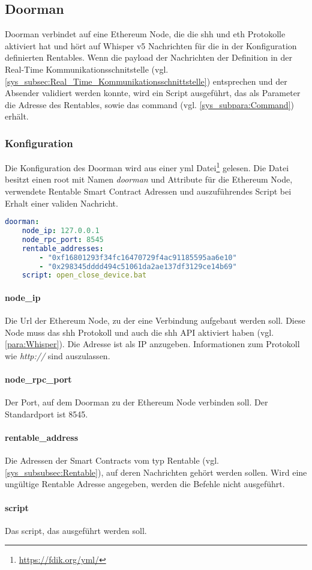 \subsection{Doorman}
\label{sys_subsec:Doorman}
Doorman verbindet auf eine Ethereum Node, die die shh und eth Protokolle aktiviert hat und hört auf Whisper v5 Nachrichten für die in der Konfiguration definierten Rentables. Wenn die payload der Nachrichten der Definition in der Real-Time Kommunikationsschnitstelle (vgl. \ref{sys_subsec:Real_Time_Kommunikationsschnittstelle}) entsprechen und der Absender validiert werden konnte, wird ein Script ausgeführt, das als Parameter die Adresse des Rentables, sowie das command (vgl. \ref{sys_subpara:Command}) erhält.

\subsubsection{Konfiguration}
\label{sys_subsec:Doorman_Konfiguration}
Die Konfiguration des Doorman wird aus einer yml Datei\footnote{\url{https://fdik.org/yml/}} gelesen. Die Datei besitzt einen root mit Namen \emph{doorman} und Attribute für die Ethereum Node, verwendete Rentable Smart Contract Adressen und auszuführendes Script bei Erhalt einer validen Nachricht.
\begin{lstlisting}[language=yml,caption={Beispielkonfiguration für Doorman}]
doorman:
    node_ip: 127.0.0.1
    node_rpc_port: 8545
    rentable_addresses:
        - "0xf16801293f34fc16470729f4ac91185595aa6e10"
        - "0x298345dddd494c51061da2ae137df3129ce14b69"
    script: open_close_device.bat
\end{lstlisting}

\paragraph{node\_ip}
Die Url der Ethereum Node, zu der eine Verbindung aufgebaut werden soll. Diese Node muss das shh Protokoll und auch die shh API aktiviert haben (vgl. \ref{para:Whisper}). Die Adresse ist als IP anzugeben. Informationen zum Protokoll wie \emph{http://} sind auszulassen.
\paragraph{node\_rpc\_port}
Der Port, auf dem Doorman zu der Ethereum Node verbinden soll. Der Standardport ist 8545.
\paragraph{rentable\_address}
Die Adressen der Smart Contracts vom typ Rentable (vgl. \ref{sys_subsubsec:Rentable}), auf deren Nachrichten gehört werden sollen. Wird eine ungültige Rentable Adresse angegeben, werden die Befehle nicht ausgeführt.
\paragraph{script}
Das script, das ausgeführt werden soll.
